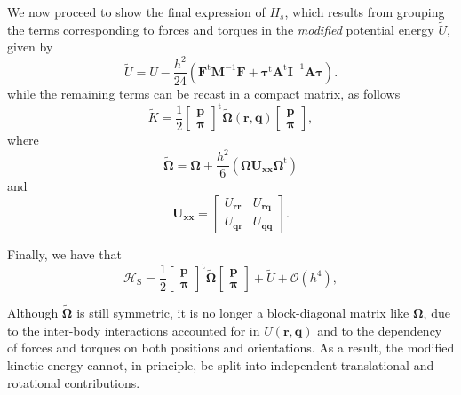 \documentclass[
journal=jctcce,
layout=twocolumn
]{achemso}
\newcommand{\mt}[1]{\boldsymbol{\mathbf{#1}}}   %
\newcommand{\vt}[1]{\boldsymbol{\mathbf{#1}}}   %
\newcommand{\tr}[1]{#1^\text{t}}                %
\newcommand{\Ham}[1]{{\mathcal H}_\text{#1}}    %
\newcommand{\timestep}{h}
\newcommand{\refined}[1]{\widetilde{#1}}
\begin{document}
We now proceed to show the final expression of $H_s$, which results from grouping the terms corresponding to forces and torques in the \textit{modified} potential energy $\tilde{U}$, given by
\begin{equation*}
\refined U = U - \frac{\timestep^2}{24} \left( \tr{\vt F} {\mt M}^{-1} {\vt F} + \tr{\vt \tau} \tr{\mt A} {\mt I}^{-1} {\mt A} {\vt \tau} \right).
\end{equation*}
while the remaining terms can be recast in a compact matrix, as follows
\begin{equation*}
\refined K = \frac{1}{2} \tr{ \left[\begin{array}{c} \vt p \\ \vt \pi \end{array}\right]} \refined{\mathbf \Omega}(\vt r, \vt q) \left[\begin{array}{c} \vt p \\ \vt \pi \end{array}\right],
\end{equation*}
where
\begin{equation*}
\tilde{\mt \Omega} = {\mt \Omega} + \frac{\timestep^2}{6} \left( {\mt \Omega} {\mt U}_{\vt x \vt x} \tr{\mt \Omega} \right)
\end{equation*}
and
\begin{equation*}
{\mt U}_{\vt x \vt x} = \left[\begin{array}{cc}
U_{\vt r \vt r} & U_{\vt r \vt q} \\
U_{\vt q \vt r} & U_{\vt q \vt q}
\end{array}\right].
\end{equation*}

Finally, we have that
\begin{equation*}
\Ham S = \frac{1}{2} \tr{\left[\begin{array}{c} \vt p \\ \vt \pi \end{array}\right]} \tilde{\mt \Omega} \left[\begin{array}{c} \vt p \\ \vt \pi \end{array}\right] + \tilde{U} + \mathcal{O}({\timestep}^4),
\end{equation*}

Although $\refined{\mathbf \Omega}$ is still symmetric, it is no longer a block-diagonal matrix like $\mt \Omega$, due to the inter-body interactions accounted for in $U(\vt r, \vt q)$ and to the dependency of forces and torques on both positions and orientations.
As a result, the modified kinetic energy cannot, in principle, be split into independent translational and rotational contributions.

\suppinfo


\end{document}
